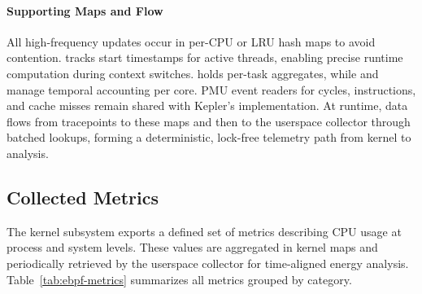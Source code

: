 \paragraph{Supporting Maps and Flow}
All high-frequency updates occur in per-CPU or LRU hash maps to avoid contention.  
 tracks start timestamps for active threads, enabling precise runtime computation during context switches.  
 holds per-task aggregates, while  and  manage temporal accounting per core.  
PMU event readers for cycles, instructions, and cache misses remain shared with Kepler’s implementation.  
At runtime, data flows from tracepoints to these maps and then to the userspace collector through batched lookups, forming a deterministic, lock-free telemetry path from kernel to analysis.

\subsection{Collected Metrics}
\label{subsec:ebpf-metrics}

The kernel  subsystem exports a defined set of metrics describing CPU usage at process and system levels.  
These values are aggregated in kernel maps and periodically retrieved by the userspace collector for time-aligned energy analysis.  
Table~\ref{tab:ebpf-metrics} summarizes all metrics grouped by category.

